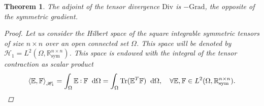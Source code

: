 \documentclass[preprint,12pt]{elsarticle}
\DeclareMathOperator{\Tr}{Tr}
\newtheorem{theorem}{Theorem}
\def\onedot{$\mathsurround0pt\ldotp$}
\def\cddot{%
	\mathbin{\vcenter{\baselineskip.67ex
			\hbox{\onedot}\hbox{\onedot}}%
}}
\begin{document}
\begin{theorem}{The adjoint of the tensor divergence $\mathrm{Div}$ is $- \mathrm{Grad}$, the opposite of the symmetric gradient.}
	\begin{proof}
	Let us consider the Hilbert space of the square integrable symmetric tensors of size $n \times n$ over an open connected set $\Omega$. This space will be denoted by $\mathscr{H}_1 = L^2(\Omega, \mathbb{R}^{n \times n}_{\text{sym}})$. This space is endowed with the integral of the tensor contraction as scalar product
	\[\left\langle \mathbb{E} , \mathbb{F} \right\rangle_{\mathscr{H}_1} = \int_{\Omega}  \mathbb{E} \cddot \mathbb{F} \; \d\Omega = \int_{\Omega} \Tr(\mathbb{E}^T \mathbb{F}) \; \d\Omega, \quad \forall \mathbb{E} , \mathbb{F} \in L^2(\Omega, \mathbb{R}^{n \times n}_{\text{sym}}). \]
	

\end{proof}
\end{theorem}
\end{document}
